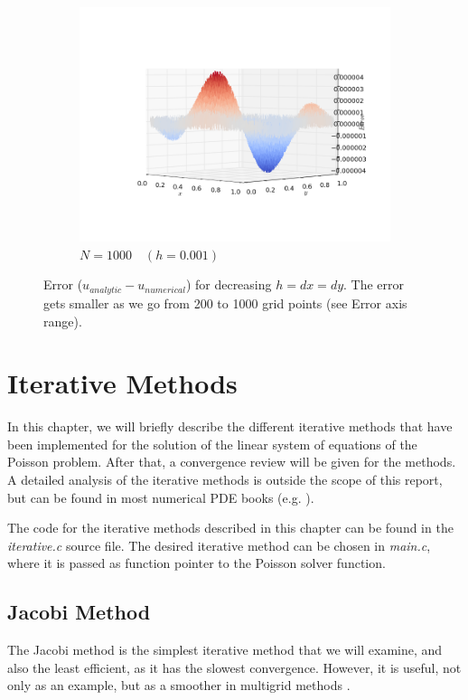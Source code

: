 \documentclass[11pt]{report}
\begin{document}
\begin{figure}[h!]
\begin{subfigure}{0.5\textwidth}
\end{subfigure}
\begin{subfigure}{0.5\textwidth}
  \centering
  \includegraphics[width=1.0\linewidth]{images/example4_1000}
  \caption{$N = 1000 \quad (h = 0.001)$}
\end{subfigure}
\caption{Error ($u_{analytic} - u_{numerical}$) for decreasing $h = dx = dy$. The error gets smaller as we go from 200 to 1000 grid points (see Error axis range). }
\label{fig:example4.2}
\end{figure}

\chapter{Iterative Methods}
In this chapter, we will briefly describe the different iterative methods that have been implemented for the solution of the linear system of equations of the Poisson problem. After that, a convergence review will be given for the methods. A detailed analysis of the iterative methods is outside the scope of this report, but can be found in most numerical PDE books (e.g. \cite{leveque}).
\newline

The code for the iterative methods described in this chapter can be found in the \emph{iterative.c} source file. The desired iterative method can be chosen in \emph{main.c}, where it is passed as function pointer to the Poisson solver function.

\section{Jacobi Method}
The Jacobi method is the simplest iterative method that we will examine, and also the least efficient, as it has the slowest convergence. However, it is useful, not only as an example, but as a smoother in multigrid methods \cite{leveque}.
\newline
\end{document}
